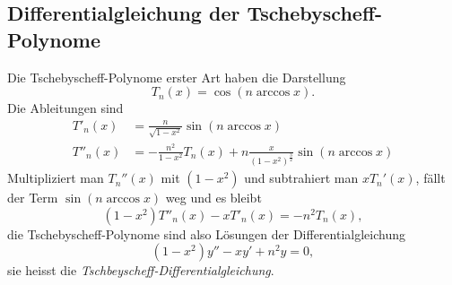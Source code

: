 \subsection{Differentialgleichung der Tschebyscheff-Polynome}
Die Tschebyscheff-Polynome erster Art haben die Darstellung
\[
T_n(x) = \cos(n\arccos x).
\]
Die Ableitungen sind
\begin{align*}
T'_n(x) &= \frac{n}{\sqrt{1-x^2}} \sin(n\arccos x)
\\
T''_n(x) &= 
-\frac{n^2}{1-x^2} T_n(x)
+
n\frac{x}{(1-x^2)^{\frac32}} \sin(n\arccos x)
\end{align*}
Multipliziert man $T_n''(x)$  mit $(1-x^2)$ und subtrahiert
man $xT_n'(x)$, fällt der Term $\sin(n\arccos x)$ weg und es bleibt
\begin{equation*}
(1-x^2)T''_n(x) -xT'_n(x) = -n^2 T_n(x),
\end{equation*}
die Tschebyscheff-Polynome sind also Lösungen der Differentialgleichung
\begin{equation}
(1-x^2)y'' -xy' +n^2 y=0,
\label{buch:differential:tschebyscheff:Tdgl}
\end{equation}
sie heisst die {\em Tschbeyscheff-Differentialgleichung}.

